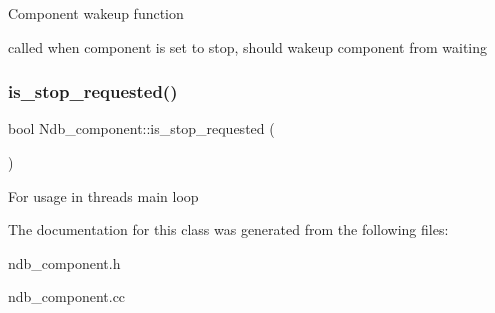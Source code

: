 Component wakeup function
\begin{DoxyItemize}
\item called when component is set to stop, should wakeup component from waiting 
\end{DoxyItemize}\mbox{\label{classNdb__component_afad79804c86f06145a1578094ffcb69d}} 
\subsubsection{\texorpdfstring{is\+\_\+stop\+\_\+requested()}{is\_stop\_requested()}}
{\footnotesize\ttfamily bool Ndb\+\_\+component\+::is\+\_\+stop\+\_\+requested (\begin{DoxyParamCaption}{ }\end{DoxyParamCaption})\hspace{0.3cm}{\ttfamily [protected]}}

For usage in threads main loop 

The documentation for this class was generated from the following files\+:\begin{DoxyCompactItemize}
\item 
ndb\+\_\+component.\+h\item 
ndb\+\_\+component.\+cc\end{DoxyCompactItemize}
